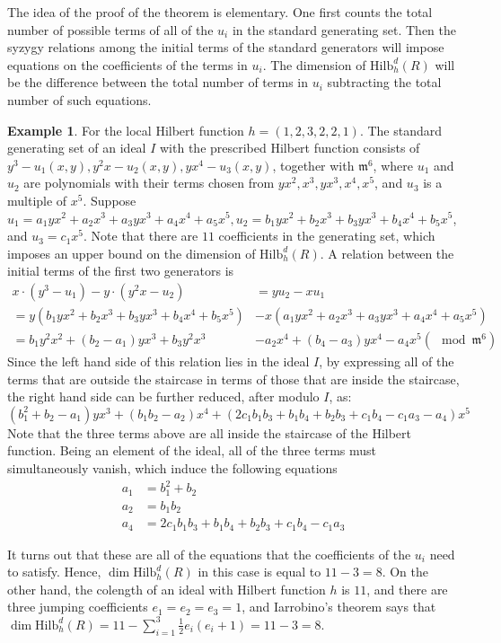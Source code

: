 \documentclass[12pt,oneside,reqno]{amsart}
\theoremstyle{definition}
\newtheorem{eg}[theorem]{Example}
\begin{document}
The idea of the proof of the theorem is elementary. One first counts the total number of possible terms of all of the $u_i$ in the standard generating set. Then the syzygy relations among the initial terms of the standard generators will impose equations on the coefficients of the terms in $u_i$. The dimension of $\mathrm{Hilb}^d_h(R)$ will be the difference between the total number of terms in $u_i$ subtracting the total number of such equations. 

\begin{eg}
For the local Hilbert function $h = (1, 2, 3, 2, 2, 1)$. The standard generating set of an ideal $I$ with the prescribed Hilbert function consists of $y^3 - u_1(x, y), y^2x - u_2(x, y), yx^4 - u_3(x, y)$, together with $\mathfrak{m}^6$, where $u_1$ and $u_2$ are polynomials with their terms chosen from $yx^2, x^3, yx^3, x^4, x^5$, and $u_3$ is a multiple of $x^5$. Suppose $u_1 = a_1yx^2 + a_2x^3 + a_3yx^3 + a_4x^4 + a_5x^5, u_2 = b_1yx^2 + b_2x^3 + b_3yx^3 + b_4x^4 + b_5x^5$, and $u_3 = c_1x^5$. Note that there are $11$ coefficients in the generating set, which imposes an upper bound on the dimension of $\mathrm{Hilb}^d_h(R)$. A relation between the initial terms of the first two generators is
\begin{align*}
x \cdot (y^3 - u_1) - y \cdot (y^2x - u_2) & = yu_2 - xu_1  \\
= y(b_1yx^2 + b_2x^3 + b_3yx^3 + b_4x^4 + b_5x^5) & - x(a_1yx^2 + a_2x^3 + a_3yx^3 + a_4x^4 + a_5x^5) \\
= b_1y^2x^2 + (b_2 - a_1)yx^3 + b_3y^2x^3 & - a_2x^4 + (b_4 - a_3)yx^4 - a_4x^5 (\mod \mathfrak{m}^6)
\end{align*}
Since the left hand side of this relation lies in the ideal $I$, by expressing all of the terms that are outside the staircase in terms of those that are inside the staircase, the right hand side can be further reduced, after modulo $I$, as:
\[
(b_1^2 + b_2 - a_1)yx^3 + (b_1b_2 - a_2)x^4 + (2c_1b_1b_3 + b_1b_4 + b_2b_3 + c_1b_4 - c_1a_3 - a_4)x^5
\]
Note that the three terms above are all inside the staircase of the Hilbert function. Being an element of the ideal, all of the three terms must simultaneously vanish, which induce the following equations
\begin{align*}
a_1 & = b_1^2 + b_2 \\
a_2 & = b_1b_2 \\
a_4 & = 2c_1b_1b_3 + b_1b_4 + b_2b_3 + c_1b_4 - c_1a_3
\end{align*}

It turns out that these are all of the equations that the coefficients of the $u_i$ need to satisfy. Hence, $\dim \mathrm{Hilb}^d_h(R)$ in this case is equal to $11 - 3 = 8$. On the other hand, the colength of an ideal with Hilbert function $h$ is $11$, and there are three jumping coefficients $e_1 = e_2 = e_3 = 1$, and Iarrobino's theorem says that $\dim \mathrm{Hilb}^d_h(R) = 11 - \sum_{i = 1}^3\frac{1}{2}e_i(e_i + 1) = 11 - 3 = 8$.
\end{eg}
\end{document}

